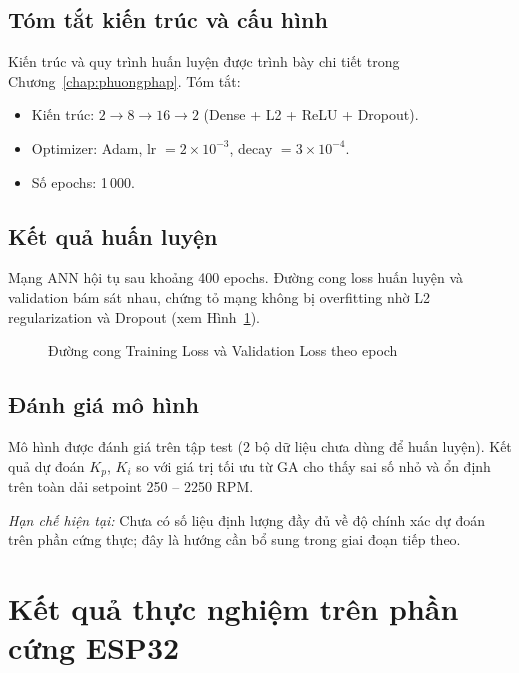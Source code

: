 \subsection{Tóm tắt kiến trúc và cấu hình}

Kiến trúc và quy trình huấn luyện được trình bày chi tiết trong
Chương~\ref{chap:phuongphap}. Tóm tắt:
\begin{itemize}
    \item Kiến trúc: $2 \to 8 \to 16 \to 2$ (Dense + L2 + ReLU + Dropout).
    \item Optimizer: Adam, lr $= 2\times10^{-3}$, decay $= 3\times10^{-4}$.
    \item Số epochs: 1\,000.
\end{itemize}

\subsection{Kết quả huấn luyện}

Mạng ANN hội tụ sau khoảng 400 epochs. Đường cong loss huấn luyện và validation
bám sát nhau, chứng tỏ mạng không bị overfitting nhờ L2 regularization và Dropout
(xem Hình~\ref{fig:loss_curve}).

\begin{figure}[H]
    \centering
    \caption{Đường cong Training Loss và Validation Loss theo epoch}
    \label{fig:loss_curve}
\end{figure}

\subsection{Đánh giá mô hình}

Mô hình được đánh giá trên tập test (2 bộ dữ liệu chưa dùng để huấn luyện).
Kết quả dự đoán $K_p$, $K_i$ so với giá trị tối ưu từ GA cho thấy sai số nhỏ
và ổn định trên toàn dải setpoint 250 -- 2250 RPM.

\textit{Hạn chế hiện tại:} Chưa có số liệu định lượng đầy đủ về độ chính xác dự đoán
trên phần cứng thực; đây là hướng cần bổ sung trong giai đoạn tiếp theo.


\section{Kết quả thực nghiệm trên phần cứng ESP32}

